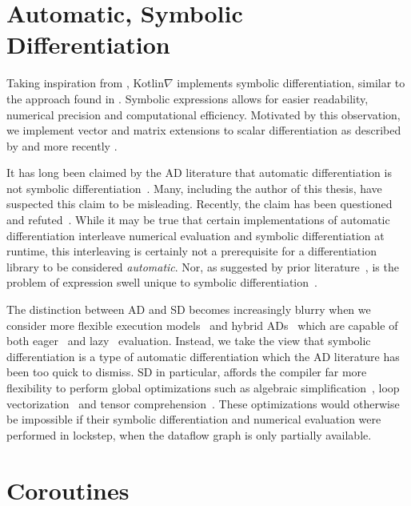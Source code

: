 \section{Automatic, Symbolic Differentiation}

Taking inspiration from \citet{mccarthy1960recursive}, Kotlin$\nabla$ implements symbolic differentiation, similar to the approach found in \citet[\S 2.56--2.58]{abelson1996structure}. Symbolic expressions allows for easier readability, numerical precision and computational efficiency. Motivated by this observation, we implement vector and matrix extensions to scalar differentiation as described by \citet{dwyer1948symbolic} and more recently \citet{laue2018computing}.

It has long been claimed by the AD literature that automatic differentiation is not symbolic differentiation~\citep{baydin2015survey}. Many, including the author of this thesis, have suspected this claim to be misleading. Recently, the claim has been questioned~\citep{wang2018demystifying} and refuted~\citep{laue2019equivalence}. While it may be true that certain implementations of automatic differentiation interleave numerical evaluation and symbolic differentiation at runtime, this interleaving is certainly not a prerequisite for a differentiation library to be considered \textit{automatic}. Nor, as suggested by prior literature~\citep{baydin2014ad}, is the problem of expression swell unique to symbolic differentiation~\citep{laue2019equivalence}.

The distinction between AD and SD becomes increasingly blurry when we consider more flexible execution models~\citep{wang2018demystifying} and hybrid ADs~\citep{abadi2016tensorflow} which are capable of both eager~\citep{paszke2019pytorch, agrawal2019tensorflow} and lazy~\citep{neubig2017dynet, van2018tangent} evaluation. Instead, we take the view that symbolic differentiation is a type of automatic differentiation which the AD literature has been too quick to dismiss. SD in particular, affords the compiler far more flexibility to perform global optimizations such as algebraic simplification~\citep{bergstra2010theano}, loop vectorization~\citep{agarwal2019static} and tensor comprehension~\citep{vasilache2018tensor, laue2020simple}. These optimizations would otherwise be impossible if their symbolic differentiation and numerical evaluation were performed in lockstep, when the dataflow graph is only partially available.

\section{Coroutines}\label{sec:coroutines}

